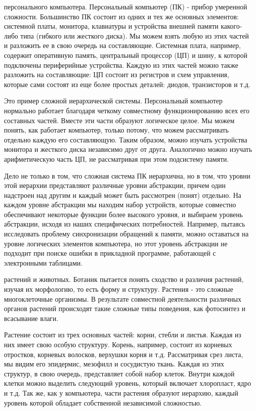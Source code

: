 \documentclass[11pt]{article}
\begin{document}
{ персонального компьютера.} Персональный компьютер (ПК) - прибор умеренной сложности. Большинство ПК состоит из одних и тех же основных элементов: системной платы, монитора, клавиатуры и устройства внешней памяти какого-либо типа (гибкого или жесткого диска). Мы можем взять любую из этих частей и разложить ее в свою очередь на составляющие. Системная плата, например, содержит оперативную память, центральный процессор (ЦП) и шину, к которой подключены периферийные устройства. Каждую из этих частей можно также разложить на составляющие: ЦП состоит из регистров и схем управления, которые сами состоят из еще более простых деталей: диодов, транзисторов и т.д. 
\parskip=2mm
\par
Это пример сложной иерархической системы. Персональный компьютер нормально работает благодаря четкому совместному функционированию всех его составных частей. Вместе эти части образуют логическое целое. Мы можем понять, как работает компьютер, только потому, что можем рассматривать отдельно каждую его составляющую. Таким образом, можно изучать устройства монитора и жесткого диска независимо друг от друга. Аналогично можно изучать арифметическую часть ЦП, не рассматривая при этом подсистему памяти. 
\par
Дело не только в том, что сложная система ПК иерархична, но в том, что уровни этой иерархии представляют различные уровни абстракции, причем один надстроен над другим и каждый может быть рассмотрен (понят) отдельно. На каждом уровне абстракции мы находим набор устройств, которые совместно обеспечивают некоторые функции более высокого уровня, и выбираем уровень абстракции, исходя из наших специфических потребностей. Например, пытаясь исследовать проблему синхронизации обращений к памяти, можно оставаться на уровне логических элементов компьютера, но этот уровень абстракции не подходит при поиске ошибки в прикладной программе, работающей с электронными таблицами. 
\par
{ растений и животных.} Ботаник пытается понять сходство и различия растений, изучая их морфологию, то есть форму и структуру. Растения - это сложные многоклеточные организмы. В результате совместной деятельности различных органов растений происходят такие сложные типы поведения, как фотосинтез и всасывание влаги. 
\par
Растение состоит из трех основных частей: корни, стебли и листья. Каждая из них имеет свою особую структуру. Корень, например, состоит из корневых отростков, корневых волосков, верхушки корня и т.д. Рассматривая срез листа, мы видим его эпидермис, мезофилл и сосудистую ткань. Каждая из этих структур, в свою очередь, представляет собой набор клеток. Внутри каждой клетки можно выделить следующий уровень, который включает хлоропласт, ядро и т.д. Так же, как у компьютера, части растения образуют иерархию, каждый уровень которой обладает собственной независимой сложностью. 
\end{document}
